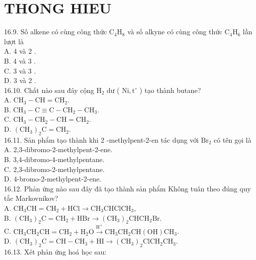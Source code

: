 \documentclass[10pt]{article}
\begin{document}
\section*{THONG HIEU}
16.9. Số alkene có cùng công thức $\mathrm{C}_{4} \mathrm{H}_{8}$ và số alkyne có cùng công thức $\mathrm{C}_{4} \mathrm{H}_{6}$ lần lượt là\\
A. 4 và 2 .\\
B. 4 và 3 .\\
C. 3 và 3 .\\
D. 3 và 2 .\\
16.10. Chất nào sau đây cộng $\mathrm{H}_{2}$ dư ( $\mathrm{Ni}, \mathrm{t}^{\circ}$ ) tạo thành butane?\\
A. $\mathrm{CH}_{3}-\mathrm{CH}=\mathrm{CH}_{2}$.\\
B. $\mathrm{CH}_{3}-\mathrm{C} \equiv \mathrm{C}-\mathrm{CH}_{2}-\mathrm{CH}_{3}$.\\
C. $\mathrm{CH}_{3}-\mathrm{CH}_{2}-\mathrm{CH}=\mathrm{CH}_{2}$.\\
D. $\left(\mathrm{CH}_{3}\right)_{2} \mathrm{C}=\mathrm{CH}_{2}$.\\
16.11. Sản phẩm tạo thành khi 2 -methylpent-2-en tác dụng với $\mathrm{Br}_{2}$ có tên gọi là\\
A. 2,3-dibromo-2-methylpent-2-ene.\\
B. 3,4-dibromo-4-methylpentane.\\
C. 2,3-dibromo-2-methylpentane.\\
D. 4-bromo-2-methylpent-2-ene.\\
16.12. Phản ứng nào sau đây đã tạo thành sản phẩm Không tuân theo đúng quy tắc Markovnikov?\\
A. $\mathrm{CH}_{3} \mathrm{CH}=\mathrm{CH}_{2}+\mathrm{HCl} \longrightarrow \mathrm{CH}_{3} \mathrm{CHClCH}_{3}$,\\
B. $\left(\mathrm{CH}_{3}\right)_{2} \mathrm{C}=\mathrm{CH}_{2}+\mathrm{HBr} \longrightarrow\left(\mathrm{CH}_{3}\right)_{2} \mathrm{CHCH}_{2} \mathrm{Br}$.\\
C. $\mathrm{CH}_{3} \mathrm{CH}_{2} \mathrm{CH}=\mathrm{CH}_{2}+\mathrm{H}_{2} \mathrm{O} \xrightarrow{\mathrm{H}^{+}} \mathrm{CH}_{3} \mathrm{CH}_{2} \mathrm{CH}(\mathrm{OH}) \mathrm{CH}_{3}$.\\
D. $\left(\mathrm{CH}_{3}\right)_{2} \mathrm{C}=\mathrm{CH}-\mathrm{CH}_{3}+\mathrm{HI} \longrightarrow\left(\mathrm{CH}_{3}\right)_{2} \mathrm{ClCH}_{2} \mathrm{CH}_{3}$.\\
16.13. Xét phản ứng hoá học sau:\\
\end{document}
